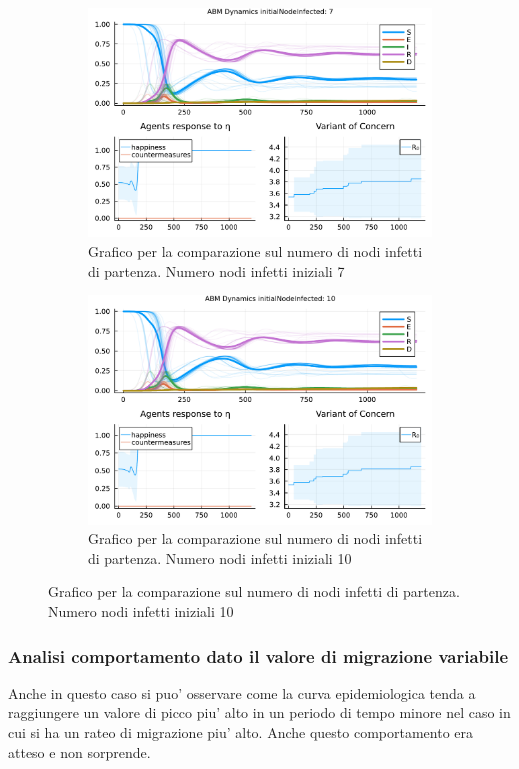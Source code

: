 \begin{figure}[!hb]
\begin{subfigure}[b]{0.45\textwidth}
		\includegraphics[width=\textwidth]{img/SocialNetworkABM_3_II.pdf}
		\caption{Grafico per la comparazione sul numero di nodi infetti di partenza. Numero nodi infetti iniziali 7}
		\label{fig:comparison_init_node_inf_7}
	\end{subfigure}
	\hfill
	\begin{subfigure}[b]{0.45\textwidth}
		\centering
		\includegraphics[width=\textwidth]{img/SocialNetworkABM_4_II.pdf}
		\caption{Grafico per la comparazione sul numero di nodi infetti di partenza. Numero nodi infetti iniziali 10}
		\label{fig:comparison_init_node_inf_10}
	\end{subfigure}
\end{figure}
\newpage

\subsubsection{Analisi comportamento dato il valore di migrazione variabile}
Anche in questo caso si puo' osservare come la curva epidemiologica tenda a raggiungere un valore 
di picco piu' alto in un periodo di tempo minore nel caso in cui si ha un rateo di migrazione piu' alto. 
Anche questo comportamento era atteso e non sorprende.

